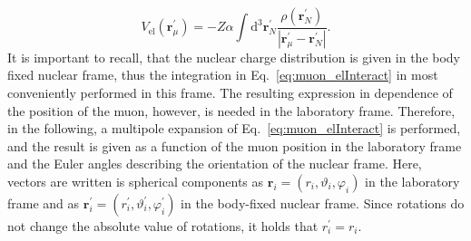 \begin{equation}
\label{eq:muon_elInteract}
V_{\text{el}}(\mathbf{r}_\mu^\prime)=-Z\alpha \int \mathrm{d}^3\mathbf{r}_N^\prime \frac{\rho(\mathbf{r}_N^\prime)}{|\mathbf{r}_\mu^\prime-\mathbf{r}_N^\prime|}.
\end{equation}
It is important to recall, that the nuclear charge distribution is given in the body fixed nuclear frame, thus the integration in Eq.~\eqref{eq:muon_elInteract} in most conveniently performed in this frame. The resulting expression in dependence of the position of the muon, however, is needed in the laboratory frame. Therefore, in the following, a multipole expansion of Eq.~\eqref{eq:muon_elInteract} is performed, and the result is given as a function of the muon position in the laboratory frame and the Euler angles describing the orientation of the nuclear frame. Here, vectors are written is spherical components as $\mathbf{r}_i = (r_i,\vartheta_i,\varphi_i)$ in the laboratory frame and as $\mathbf{r}_i^\prime = (r_i^\prime,\vartheta_i^\prime,\varphi_i^\prime)$ in the body-fixed nuclear frame. Since rotations do not change the absolute value of rotations, it holds that $r_i^\prime = r_i$.\\

